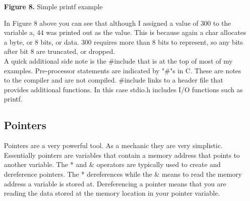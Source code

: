 \documentclass[paper=a4, fontsize=11pt]{scrartcl}
\numberwithin{equation}{section}		%
\numberwithin{figure}{section}			%
\numberwithin{table}{section}			%
\begin{document}
\vskip 0.05in
\centerline{\textbf{Figure 8. }Simple printf example}
\vskip 0.1in
In Figure 8 above you can see that although I assigned a value of 300 to the variable a, 44 was printed out as the value. This is because again a char allocates a byte, or 8 bits, or data. 300 requires more than 8 bits to represent, so any bits after bit 8 are truncated, or dropped. \\

A quick additional side note is the \#include that is at the top of most of my examples. Pre-processor statements are indicated by "\#"s in C. These are notes to the compiler and are not compiled. \#include links to a header file that provides additional functions. In this case stdio.h includes I/O functions such as printf. 

\subsection{Pointers}
Pointers are a very powerful tool. As a mechanic they are very simplistic. Essentially pointers are variables that contain a memory address that points to another variable. The * and \& operators are typically used to create and dereference pointers. The * dereferences while the \& means to read the memory address a variable is stored at. Dereferencing a pointer means that you are reading the data stored at the memory location in your pointer variable.
\end{document}
